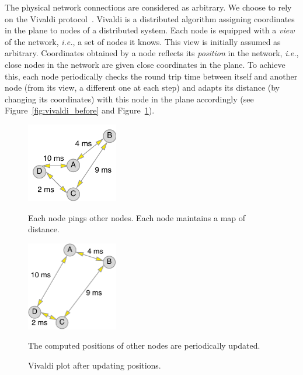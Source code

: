 The physical network connections are considered as arbitrary. We choose to
rely on the Vivaldi protocol~\cite{dabek:2001:sigcomm04}. Vivaldi is a
distributed algorithm assigning coordinates in the plane to nodes of a
distributed system. Each node is equipped with a \emph{view} of the network,
\emph{i.e.}, a set of nodes it knows. This view is initially assumed as
arbitrary. Coordinates obtained by a node reflects its \emph{position} in the
network, \emph{i.e.}, close nodes in the network are given close coordinates in
the plane. To achieve this, each node periodically checks the round trip
time between itself and another node (from its view, a different one at each
step) and adapts its distance (by changing its coordinates) with this node in
the plane accordingly (see Figure~\ref{fig:vivaldi_before} and Figure~\ref{fig:vivaldi_after}). 

\begin{figure}
  \begin{minipage}[c]{.45\linewidth}
	\vspace*{.5cm}
   \hspace*{-0.5cm}
      	\centering \includegraphics[width=4cm]{./FIGS/vivaldi_before.pdf}

   \hspace*{0.5cm}
	\vspace*{.4cm}
		\caption{Vivaldi plot before updating positions.}
		{\small Each node pings other nodes. Each node maintains a map of distance.}
\label{fig:vivaldi_before}
   \end{minipage}
\hspace*{0.6cm}
   \begin{minipage}[c]{.45\linewidth}
   	\centering \includegraphics[width=4cm]{./FIGS/vivaldi_after.pdf}
	\vspace*{0.40cm}
		\caption{Vivaldi plot after updating positions.}
		\label{fig:vivaldi_after} 
{\small The computed positions of other nodes are periodically updated.}
  \end{minipage} \hfill
\end{figure}

